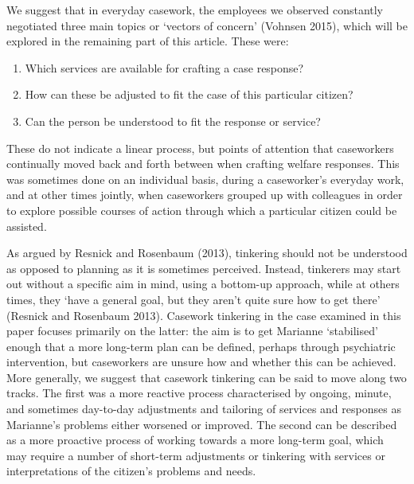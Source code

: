 \par
We suggest that in everyday casework, the employees we observed constantly negotiated three main topics or ‘vectors of concern’ (Vohnsen 2015), which will be explored in the remaining part of this article. These were:
\begin{enumerate}
    \item Which services are available for crafting a case response?
    \item How can these be adjusted to fit the case of this particular citizen?
    \item Can the person be understood to fit the response or service?
\end{enumerate}
These do not indicate a linear process, but points of attention that caseworkers continually moved back and forth between when crafting welfare responses. This was sometimes done on an individual basis, during a caseworker’s everyday work, and at other times jointly, when caseworkers grouped up with colleagues in order to explore possible courses of action through which a particular citizen could be assisted.
\par
As argued by Resnick and Rosenbaum (2013), tinkering should not be understood as opposed to planning as it is sometimes perceived. Instead, tinkerers may start out without a specific aim in mind, using a bottom-up approach, while at others times, they ‘have a general goal, but they aren’t quite sure how to get there’ (Resnick and Rosenbaum 2013). Casework tinkering in the case examined in this paper focuses primarily on the latter: the aim is to get Marianne ‘stabilised’ enough that a more long-term plan can be defined, perhaps through psychiatric intervention, but caseworkers are unsure how and whether this can be achieved. More generally, we suggest that casework tinkering can be said to move along two tracks. The first was a more reactive process characterised by ongoing, minute, and sometimes day-to-day adjustments and tailoring of services and responses as Marianne’s problems either worsened or improved. The second can be described as a more proactive process of working towards a more long-term goal, which may require a number of short-term adjustments or tinkering with services or interpretations of the citizen’s problems and needs. 

